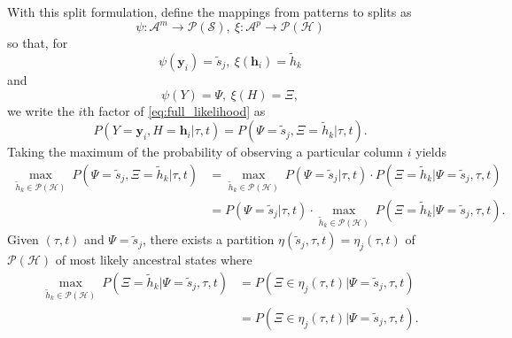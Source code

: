 \documentclass[a4paper]{article}
\newcommand{\alphabet}{\mathcal{A}}
\newcommand{\alignmentColumn}{\mathbf{y}}
\newcommand{\alignmentColumnRV}{Y}
\newcommand{\siteSplit}{\tilde{s}}
\newcommand{\siteSplitSet}{\mathcal{S}}
\newcommand{\ancestralStateColumn}{\mathbf{h}}
\newcommand{\ancestralStateColumnRV}{H}
\newcommand{\ancestralSplit}{\tilde{h}}
\newcommand{\ancestralSplitSet}{\mathcal{H}}
\newcommand{\ancestralSplitPartition}{\eta}
\newcommand{\patternToSplit}{\psi}
\newcommand{\ancestralToSplit}{\xi}
\newcommand{\siteSplitRV}{\Psi}
\newcommand{\ancestralSplitRV}{\Xi}
\newcommand{\nSiteRows}{m}
\newcommand{\nAncestralStateRows}{p}
\begin{document}

With this split formulation, define the mappings from patterns to splits as
$$
\patternToSplit:\alphabet^\nSiteRows\rightarrow\mathcal{P}(\siteSplitSet), \ \ancestralToSplit:\alphabet^\nAncestralStateRows\rightarrow\mathcal{P}(\ancestralSplitSet)
$$
so that, for
$$
\patternToSplit(\alignmentColumn_i)=\siteSplit_j, \ \ancestralToSplit(\ancestralStateColumn_i)=\ancestralSplit_k
$$
and
$$
\patternToSplit(\alignmentColumnRV)=\siteSplitRV, \ \ancestralToSplit(\ancestralStateColumnRV)=\ancestralSplitRV,
$$
we write the $i$th factor of \eqref{eq:full_likelihood} as
$$
P(\alignmentColumnRV=\alignmentColumn_i, \ancestralStateColumnRV=\ancestralStateColumn_i | \tau, t)=P(\siteSplitRV=\siteSplit_j, \ancestralSplitRV=\ancestralSplit_k | \tau, t).
$$
Taking the maximum of the probability of observing a particular column $i$ yields
\begin{align*}
\max_{\ancestralSplit_k\in\mathcal{P}(\ancestralSplitSet)} \ P(\siteSplitRV=\siteSplit_j, \ancestralSplitRV=\ancestralSplit_k | \tau, t) &=
\max_{\ancestralSplit_k\in\mathcal{P}(\ancestralSplitSet)} \ P(\siteSplitRV=\siteSplit_j| \tau, t)\cdot P(\ancestralSplitRV=\ancestralSplit_k |\siteSplitRV=\siteSplit_j, \tau, t) \\
&= P(\siteSplitRV=\siteSplit_j| \tau, t)\cdot\max_{\ancestralSplit_k\in\mathcal{P}(\ancestralSplitSet)} \ P(\ancestralSplitRV=\ancestralSplit_k |\siteSplitRV=\siteSplit_j, \tau, t).
\end{align*}
Given $(\tau, t)$ and $\siteSplitRV=\siteSplit_j$, there exists a partition $\ancestralSplitPartition(\siteSplit_j, \tau, t)=\ancestralSplitPartition_j(\tau, t)$ of $\mathcal{P}(\ancestralSplitSet)$ of most likely ancestral states where
\begin{align*}
\max_{\ancestralSplit_k\in\mathcal{P}(\ancestralSplitSet)} \ P(\ancestralSplitRV=\ancestralSplit_k | \siteSplitRV=\siteSplit_j, \tau, t) &= P(\ancestralSplitRV\in\ancestralSplitPartition_j(\tau, t) | \siteSplitRV=\siteSplit_j, \tau, t) \\
     &= P(\ancestralSplitRV\in\ancestralSplitPartition_j(\tau, t) | \siteSplitRV=\siteSplit_j, \tau, t).
\end{align*}
\end{document}
